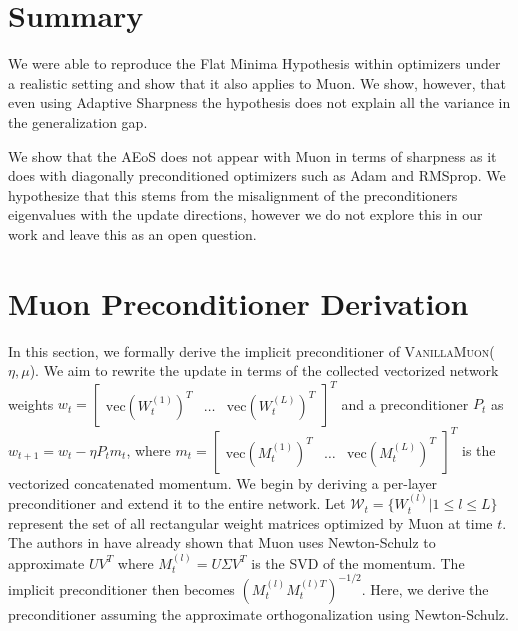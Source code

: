 \documentclass{article}
\theoremstyle{plain}
\theoremstyle{definition}
\theoremstyle{remark}
\begin{document}
\section{Summary}

We were able to reproduce the Flat Minima Hypothesis within optimizers under a realistic setting and show that it also applies to Muon. We show, however, that even using Adaptive Sharpness the hypothesis does not explain all the variance in the generalization gap.

We show that the AEoS does not appear with Muon in terms of sharpness as it does with diagonally preconditioned optimizers such as Adam and RMSprop. We hypothesize that this stems from the misalignment of the preconditioners eigenvalues with the update directions, however we do not explore this in our work and leave this as an open question.





\newpage
\appendix
\onecolumn
\section{Muon Preconditioner Derivation} \label{app:muon_preconditioner}

In this section, we formally derive the implicit preconditioner of \textsc{VanillaMuon}($\eta, \mu$). We aim to rewrite the update in terms of the collected vectorized network weights $w_t = \begin{bmatrix}\text{vec}(W_t^{(1)})^T & \dots & \text{vec}(W_t^{(L)})^T\end{bmatrix}^T$ and a preconditioner $P_{t}$ as $w_{t+1} = w_t - \eta P_{t} m_{t}$, where $m_{t} = \begin{bmatrix}\text{vec}(M_{t}^{(1)})^T & \dots & \text{vec}(M_{t}^{(L)})^T\end{bmatrix}^T$ is the vectorized concatenated momentum. We begin by deriving a per-layer preconditioner and extend it to the entire network. Let $\mathcal{W}_t = \{W_t^{(l)} | 1 \le l \le L\}$ represent the set of all rectangular weight matrices optimized by Muon at time $t$. The authors in \cite{liu2025muonscalableLLM} have already shown that Muon uses Newton-Schulz to approximate $UV^T$ where $M_{t}^{(l)} = U \Sigma V^T$ is the SVD of the momentum. The implicit preconditioner then becomes $(M_{t}^{(l)}M_{t}^{(l)T})^{-1/2}$. Here, we derive the preconditioner assuming the approximate orthogonalization using Newton-Schulz.
\end{document}
